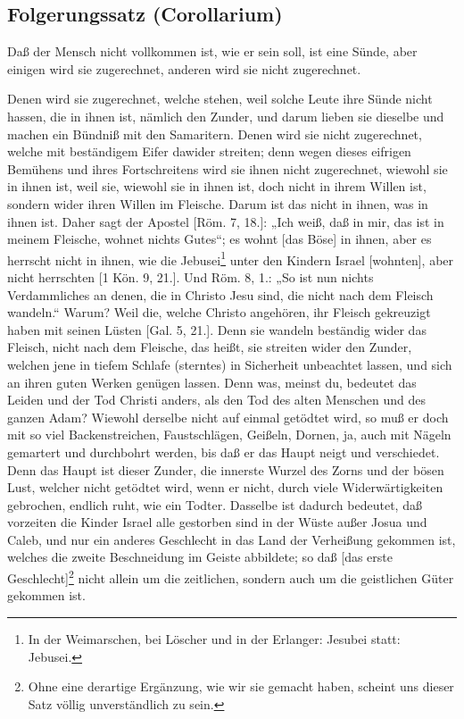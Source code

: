 \subsection{Folgerungssatz (Corollarium)}

Daß der Mensch nicht vollkommen ist, wie er sein soll, ist eine Sünde, aber einigen wird sie zugerechnet, anderen wird sie nicht zugerechnet.

Denen wird sie zugerechnet, welche stehen, weil solche Leute ihre Sünde nicht hassen, die in ihnen ist, nämlich den Zunder, und darum lieben sie dieselbe und machen ein Bündniß mit den Samaritern. Denen wird sie nicht zugerechnet, welche mit beständigem Eifer dawider streiten; denn wegen dieses eifrigen Bemühens und ihres Fortschreitens wird sie ihnen nicht zugerechnet, wiewohl sie in ihnen ist, weil sie, wiewohl sie in ihnen ist, doch nicht in ihrem Willen ist, sondern wider ihren Willen im Fleische. Darum ist das nicht in ihnen, was in ihnen ist. Daher sagt der Apostel [Röm. 7, 18.]: „Ich weiß, daß in mir, das ist in meinem Fleische, wohnet nichts Gutes“; es wohnt [das Böse] in ihnen, aber es herrscht nicht in ihnen, wie die Jebusei\footnote{In der Weimarschen, bei Löscher und in der Erlanger: Jesubei statt: Jebusei.} unter den Kindern Israel [wohnten], aber nicht herrschten [1 Kön. 9, 21.]. Und Röm. 8, 1.: „So ist nun nichts Verdammliches an denen, die in Christo Jesu sind, die nicht nach dem Fleisch wandeln.“ Warum? Weil die, welche Christo angehören, ihr Fleisch gekreuzigt haben mit seinen Lüsten [Gal. 5, 21.]. Denn sie wandeln beständig wider das Fleisch, nicht nach dem Fleische, das heißt, sie streiten wider den Zunder, welchen jene in tiefem Schlafe (sterntes) in Sicherheit unbeachtet lassen, und sich an ihren guten Werken genügen lassen. Denn was, meinst du, bedeutet das Leiden und der Tod Christi anders, als den Tod des alten Menschen und des
ganzen Adam? Wiewohl derselbe nicht auf einmal getödtet wird, so muß er doch mit so viel Backenstreichen, Faustschlägen, Geißeln, Dornen, ja, auch mit Nägeln gemartert und durchbohrt werden, bis daß er das Haupt neigt und verschiedet. Denn das Haupt ist dieser Zunder, die innerste Wurzel des Zorns und der bösen Lust, welcher nicht getödtet wird, wenn er nicht, durch viele Widerwärtigkeiten gebrochen, endlich ruht, wie ein Todter. Dasselbe ist dadurch bedeutet, daß vorzeiten die Kinder Israel alle gestorben sind in der Wüste außer Josua und Caleb, und nur ein anderes Geschlecht in das Land der Verheißung gekommen ist, welches die zweite Beschneidung im Geiste abbildete; so daß [das erste Geschlecht]\footnote{Ohne eine derartige Ergänzung, wie wir sie gemacht haben, scheint uns dieser Satz völlig unverständlich zu sein.} nicht allein um die zeitlichen, sondern auch um die geistlichen Güter gekommen ist.

